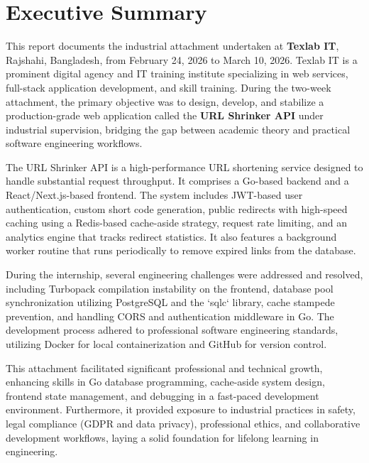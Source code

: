 \chapter*{Executive Summary}

This report documents the industrial attachment undertaken at \textbf{Texlab IT}, Rajshahi, Bangladesh, from February 24, 2026 to March 10, 2026. Texlab IT is a prominent digital agency and IT training institute specializing in web services, full-stack application development, and skill training. During the two-week attachment, the primary objective was to design, develop, and stabilize a production-grade web application called the \textbf{URL Shrinker API} under industrial supervision, bridging the gap between academic theory and practical software engineering workflows.

The URL Shrinker API is a high-performance URL shortening service designed to handle substantial request throughput. It comprises a Go-based backend and a React/Next.js-based frontend. The system includes JWT-based user authentication, custom short code generation, public redirects with high-speed caching using a Redis-based cache-aside strategy, request rate limiting, and an analytics engine that tracks redirect statistics. It also features a background worker routine that runs periodically to remove expired links from the database. 

During the internship, several engineering challenges were addressed and resolved, including Turbopack compilation instability on the frontend, database pool synchronization utilizing PostgreSQL and the `sqlc` library, cache stampede prevention, and handling CORS and authentication middleware in Go. The development process adhered to professional software engineering standards, utilizing Docker for local containerization and GitHub for version control.

This attachment facilitated significant professional and technical growth, enhancing skills in Go database programming, cache-aside system design, frontend state management, and debugging in a fast-paced development environment. Furthermore, it provided exposure to industrial practices in safety, legal compliance (GDPR and data privacy), professional ethics, and collaborative development workflows, laying a solid foundation for lifelong learning in engineering.
